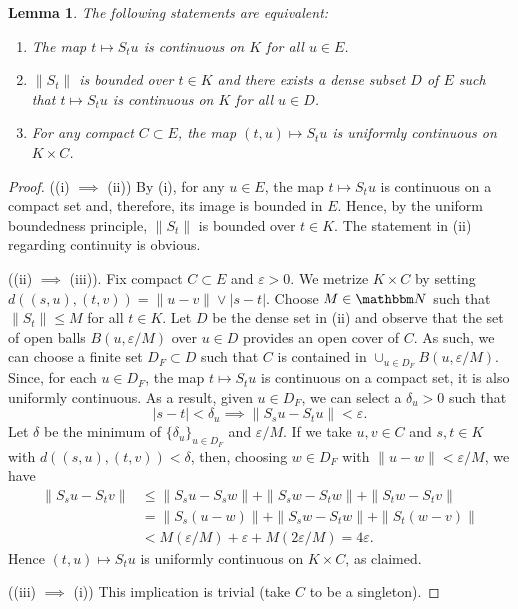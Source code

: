 \documentclass[12pt, reqno]{amsart}
\renewcommand{\leq}{\leqslant}
\newcommand{\1}{\mathbbm 1}
\newcommand{\NN}{\mathbbm N}
\renewcommand{\epsilon}{\varepsilon}
\theoremstyle{plain}
\newtheorem{lemma}[theorem]{Lemma}
\theoremstyle{definition}
\begin{document}
\begin{lemma}\label{l:contin}
    The following statements are equivalent:
    \begin{enumerate}
        \item The map $t \mapsto S_t u$ is continuous on $K$ for all $u \in E$.
        \item $\|S_t\|$ is bounded over $t \in K$ and there exists a dense subset
            $D$ of $E$ such that $t \mapsto S_t u$ is continuous on $K$ for all $u \in D$.
        \item For any compact $C \subset E$, the map $(t, u) \mapsto S_t u$ is
            uniformly continuous on $K \times C$.
    \end{enumerate}
\end{lemma}

\begin{proof}
    ((i) $\implies$ (ii)) By (i), for any $u \in E$, the map $t \mapsto S_t u$ is
    continuous on a compact set and, therefore, its image is bounded in $E$.  
    Hence, by the uniform boundedness principle, $\|S_t\|$ is bounded over $t
    \in K$.  The statement in (ii) regarding continuity is obvious.

    ((ii) $\implies$ (iii)).  Fix compact $C \subset E$ and $\epsilon > 0$.
    We metrize $K \times C$ by setting $d((s, u), (t, v)) = \| u - v\| \vee |s-t|$.
    Choose $M \in \NN$ such that $\|S_t\| \leq M$ for all $t \in K$.  Let $D$ be the
    dense set in (ii) and observe that the set of open balls $B(u, \epsilon/M)$
    over $u \in D$ provides an open cover of $C$.  As such, we can choose a finite
    set $D_F \subset D$ such that $C$ is contained in $\cup_{u \in D_F} B(u,
    \epsilon/M)$. Since, for each $u \in D_F$, the map
    $t \mapsto S_t u$ is continuous on a compact set, it is also uniformly
    continuous.  As a result, given $u \in D_F$, we can select a $\delta_u > 0$ such that
    \begin{equation*}
        |s - t| < \delta_u \implies \| S_s u - S_t u \| < \epsilon.
    \end{equation*}
    Let $\delta$ be the minimum of $\{\delta_u\}_{u \in D_F}$ and $\epsilon / M$.
    If we take $u, v \in C$ and $s, t \in K$ with $d((s, u), (t, v)) < \delta$, then,
    choosing $w \in D_F$ with $\|u - w \| < \epsilon / M$, we have
    \begin{align*}
        \| S_s u - S_t v \|
        & \leq \| S_s u - S_s w \| 
            + \| S_s w - S_t w \| 
                + \| S_t w - S_t v \|
                \\
        & = \| S_s (u - w) \| 
            + \| S_s w - S_t w \| 
                + \| S_t (w - v) \|
                \\
        & < M (\epsilon / M) + \epsilon + M (2 \epsilon / M) = 4 \epsilon.
    \end{align*}
    Hence $(t, u) \mapsto S_t u$ is
            uniformly continuous on $K \times C$, as claimed.

    ((iii) $\implies$ (i)) This implication is trivial (take $C$ to be a
    singleton).
\end{proof}
\end{document}
